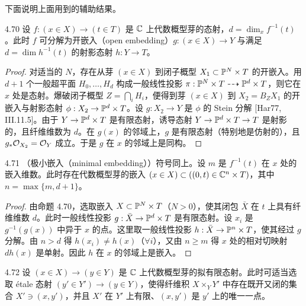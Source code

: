 下面说明上面用到的辅助结果。

\begin{propositionp}{4.70}
设 $f:(x\in X)\to(t\in T)$ 是 $\mathbb{C}$ 上代数概型芽的态射，$d=\dim_xf^{-1}(t)$。此时 $f$ 可分解为开嵌入（open embedding）$g:(x\in X)\to Y$ 与满足 $d=\dim h^{-1}(t)$ 的射影态射 $h:Y\to T$。
\end{propositionp}

\begin{proof}
对适当的 $N$，存在从芽 $(x\in X)$ 到闭子概型 $X_1\subset\mathbb{P}^N\times T$ 的开嵌入。用 $d+1$ 个一般超平面 $H_0,\dots,H_d$ 构成一般线性投影 $\pi:\mathbb{P}^N\times T\dashrightarrow\mathbb{P}^d\times T$，则它在 $x$ 处是态射。爆破闭子概型 $Z=\bigcap_iH_i$，便得到芽 $(x\in X)$ 到 $X_2=B_ZX_1$ 的开嵌入与射影态射 $\phi:X_2\to\mathbb{P}^d\times T$。设 $g:X_2\to Y$ 是 $\phi$ 的 Stein 分解 [Har77, III.11.5]。由于 $Y\to\mathbb{P}^d\times T$ 是有限态射，诱导态射 $Y\to\mathbb{P}^d\times T\to T$ 是射影的，且纤维维数为 $d$。在 $g(x)$ 的邻域上，$g$ 是有限态射（特别地是仿射的），且 $g_*\mathcal{O}_{X_2}=\mathcal{O}_Y$ 成立。于是 $g$ 在 $x$ 的邻域上是同构。
\end{proof}

\begin{corollaryp}{4.71}
（极小嵌入（minimal embedding））符号同上。设 $m$ 是 $f^{-1}(t)$ 在 $x$ 处的嵌入维数。此时存在代数概型芽的嵌入 $(x\in X)\subset((0,t)\in\mathbb{C}^n\times T)$，其中 $n=\max\{m,d+1\}$。
\end{corollaryp}

\begin{proof}
由命题 4.70，选取嵌入 $X\subset\mathbb{P}^N\times T$（$N>0$），使其闭包 $\bar X$ 在 $t$ 上具有纤维维数 $d$。此时一般线性投影 $g:\bar X\to\mathbb{P}^d\times T$ 是有限态射。设 $x_i$ 是 $g^{-1}(g(x))$ 中异于 $x$ 的点。这里取一般线性投影 $h:\bar X\to\mathbb{P}^n\times T$，使其经过 $g$ 分解。由 $n>d$ 得 $h(x_i)\ne h(x)$（$\forall i$），又由 $n\ge m$ 得 $x$ 处的相对切映射 $dh(x)$ 是单射。因此 $h$ 在 $x$ 的邻域上是嵌入。
\end{proof}

\begin{lemmap}{4.72}
设 $(x\in X)\to(y\in Y)$ 是 $\mathbb{C}$ 上代数概型芽的拟有限态射。此时可适当选取 étale 态射 $(y'\in Y')\to(y\in Y)$，使得纤维积 $X\times_YY'$ 中存在既开又闭的集合 $X'\ni(x,y')$，并且 $X'$ 在 $Y'$ 上有限、$(x,y')$ 是 $y'$ 上的唯一一点。
\end{lemmap}

